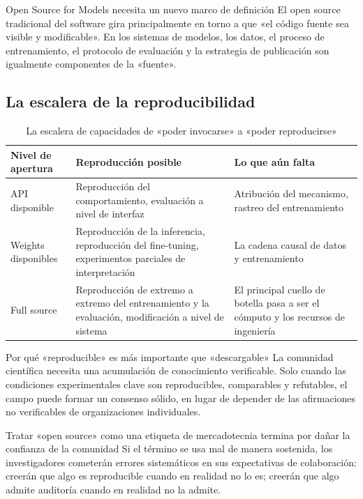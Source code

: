 \documentclass[a4paper]{article}
\begin{document}
\begin{importantbox}{Open Source for Models necesita un nuevo marco de definición}
El open source tradicional del software gira principalmente en torno a que «el código fuente sea visible y modificable».  
En los sistemas de modelos, los datos, el proceso de entrenamiento, el protocolo de evaluación y la estrategia de publicación son igualmente componentes de la «fuente».
\end{importantbox}

\subsection{La escalera de la reproducibilidad}
\begin{table}[H]
\centering
\begin{tabular}{p{3.0cm}p{3.8cm}p{4.8cm}}
\toprule
\textbf{Nivel de apertura} & \textbf{Reproducción posible} & \textbf{Lo que aún falta} \\
\midrule
API disponible & Reproducción del comportamiento, evaluación a nivel de interfaz & Atribución del mecanismo, rastreo del entrenamiento \\
Weights disponibles & Reproducción de la inferencia, reproducción del fine-tuning, experimentos parciales de interpretación & La cadena causal de datos y entrenamiento \\
Full source & Reproducción de extremo a extremo del entrenamiento y la evaluación, modificación a nivel de sistema & El principal cuello de botella pasa a ser el cómputo y los recursos de ingeniería \\
\bottomrule
\end{tabular}
\caption{La escalera de capacidades de «poder invocarse» a «poder reproducirse»}
\end{table}

\begin{knowledgebox}{Por qué «reproducible» es más importante que «descargable»}
La comunidad científica necesita una acumulación de conocimiento verificable. Solo cuando las condiciones experimentales clave son reproducibles, comparables y refutables, el campo puede formar un consenso sólido, en lugar de depender de las afirmaciones no verificables de organizaciones individuales.
\end{knowledgebox}

\begin{warningbox}{Tratar «open source» como una etiqueta de mercadotecnia termina por dañar la confianza de la comunidad}
Si el término se usa mal de manera sostenida, los investigadores cometerán errores sistemáticos en sus expectativas de colaboración:  
creerán que algo es reproducible cuando en realidad no lo es; creerán que algo admite auditoría cuando en realidad no la admite.
\end{warningbox}
\end{document}
